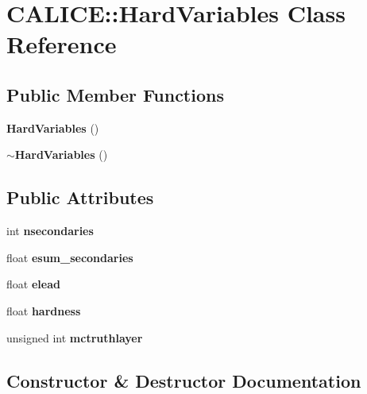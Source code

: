 \section{C\-A\-L\-I\-C\-E\-:\-:Hard\-Variables Class Reference}
\label{classCALICE_1_1HardVariables}
\subsection*{Public Member Functions}
\begin{DoxyCompactItemize}
\item 
{\bf Hard\-Variables} ()
\item 
{\bf $\sim$\-Hard\-Variables} ()
\end{DoxyCompactItemize}
\subsection*{Public Attributes}
\begin{DoxyCompactItemize}
\item 
int {\bfseries nsecondaries}\label{classCALICE_1_1HardVariables_a43bce8a745748d4e86364e017be1a893}

\item 
float {\bfseries esum\-\_\-secondaries}\label{classCALICE_1_1HardVariables_a8ad81a22c393f8943d3e14cab28466b8}

\item 
float {\bfseries elead}\label{classCALICE_1_1HardVariables_a7238955be5187dcd978236aac694f1b4}

\item 
float {\bfseries hardness}\label{classCALICE_1_1HardVariables_a3b7667e23ac6aa3158d3afc5fa1a495e}

\item 
unsigned int {\bfseries mctruthlayer}\label{classCALICE_1_1HardVariables_ad59942bb810b81aaf614abdde2c855eb}

\end{DoxyCompactItemize}


\subsection{Constructor \& Destructor Documentation}
